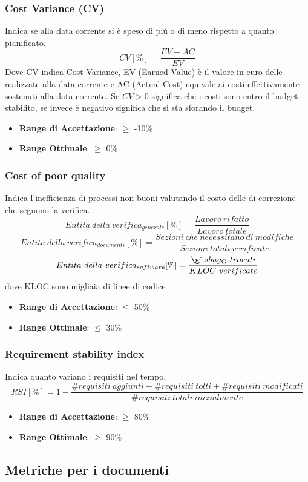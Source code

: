 \documentclass[12pt,a4paper]{article}
\begin{document}
\subsubsection{Cost Variance (CV)}
Indica se alla data corrente si è speso di più o di meno rispetto a quanto pianificato.
\[CV [\%] = \frac{EV - AC}{EV}\]
Dove CV indica Cost Variance, EV (Earned Value) è il valore in euro delle  realizzate alla data corrente e AC (Actual Cost) equivale ai costi effettivamente sostenuti alla data corrente.
Se $CV > 0$ significa che i costi sono entro il budget stabilito, se invece è negativo significa che si sta sforando il budget.
\begin{itemize}
\item \textbf{Range di Accettazione}: $\geq$ -10\%
\item \textbf{Range Ottimale}: $\geq$ 0\%
\end{itemize}
\subsubsection{Cost of poor quality}
Indica l'inefficienza di processi non buoni valutando il costo delle  di correzione che seguono la verifica.
	\[Entita\ della\ verifica_{generale}[\%]= \frac{Lavoro\ rifatto}{Lavoro\ totale}\]
	\[Entita\ della\ verifica_{documenti}[\%]= \frac{Sezioni\ che\ necessitano\ di\ modifiche}{Sezioni\ totali\ verificate}\]
	\[Entita\ della\ verifica_{software}[\%]= \frac{\mgls{bug}\ trovati}{KLOC\ verificate}\]
dove KLOC sono migliaia di linee di codice
\begin{itemize}
	\item \textbf{Range di Accettazione}: $\leq$ 50\%
	\item \textbf{Range Ottimale}: $\leq$ 30\%
\end{itemize}
\subsubsection{Requirement stability index}
Indica quanto variano i requisiti nel tempo.
\[RSI[\%]= 1 - \frac{\#requisiti\ aggiunti+\#requisiti\ tolti+\#requisiti\ modificati}{\#requisiti\ totali\ inizialmente}\]
\begin{itemize}
	\item \textbf{Range di Accettazione}: $\geq$ 80\%
	\item \textbf{Range Ottimale}: $\geq$ 90\%
\end{itemize}
\subsection{Metriche per i documenti}\label{metriche_doc}
\end{document}
